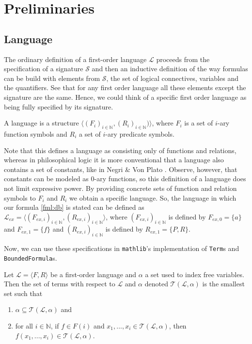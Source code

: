 \chapter{Preliminaries}
\section{Language}\label{subsec:language}
The ordinary definition of a first-order language $\mathcal{L}$ proceeds from the specification of a signature $\mathcal{S}$ and then an inductive definition of the way formulas can be build with elements from $\mathcal{S}$, the set of logical connectives, variables and the quantifiers. See that for any first order language all these elements except the signature are the same. Hence, we could think of a specific first order language as being fully specified by its signature.

\begin{definition}\label{def:FO-Language}
\leanok
  A language is a structure $\langle(F_i)_{i\in \mathbb{N}}, (R_i)_{i\in \mathbb{N}})\rangle$, where $F_i$ is a set of $i$-ary function symbols and $R_i$ a set of $i$-ary predicate symbols.
\end{definition}

Note that this defines a language as consisting only of functions and relations, whereas in philosophical logic it is more conventional that a language also contains a set of constants, like in Negri \& Von Plato \cite{negri:2001}. Observe, however, that constants can be modeled as $0$-ary functions, so this definition of a language does not limit expressive power. By providing concrete sets of function and relation symbols to $F_i$ and $R_i$ we obtain a specific language. So, the language in which our formula \ref{fml:db} is stated can be defined as $\mathcal{L}_{ex} = \langle (F_{ex,i})_{i \in \mathbb{N}}, (R_{ex,i})_{i \in \mathbb{N}} \rangle$, where $(F_{ex,i})_{i \in \mathbb{N}}$ is defined by $F_{ex,0} = \{a\}$ and $F_{ex,1} = \{f\}$ and $(R_{ex,i})_{i \in \mathbb{N}}$ is defined by $R_{ex,1} = \{P, R\}$.

Now, we can use these specifications in \texttt{mathlib}'s implementation of \texttt{Term}s and \texttt{BoundedFormula}s.

\begin{definition}\label{def:FO-Term}
  \leanok
    Let $\mathcal{L} = \langle F, R \rangle$ be a first-order language and $\alpha$ a set used to index free variables. Then the set of terms with respect to $\mathcal{L}$ and $\alpha$ denoted $\mathcal{T}(\mathcal{L},\alpha)$ is the smallest set such that
        \begin{enumerate}
            \item $\alpha \subseteq \mathcal{T}(\mathcal{L},\alpha)$ and
            \item for all $i \in \mathbb{N}$, if $f \in F(i)$ and $x_1,...,x_i \in \mathcal{T}(\mathcal{L},\alpha)$, then $f(x_1,...,x_i) \in \mathcal{T}(\mathcal{L},\alpha)$.
        \end{enumerate}
\end{definition}

